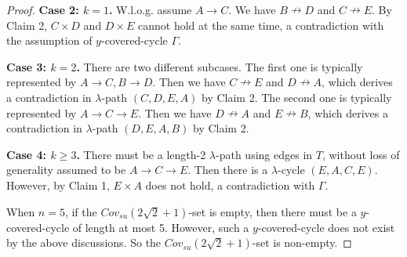 \documentclass[11pt]{article}
\theoremstyle{remark}
\begin{document}
\begin{proof}
\noindent\textbf{Case 2: $k=1$.} W.l.o.g. assume $A\rightarrow C$. We have $B\nrightarrow D$ and $C\nrightarrow E$. By Claim 2, $C\times D$ and $D\times E$ cannot hold at the same time, a contradiction with the assumption of  $y$-covered-cycle $\Gamma$.

\noindent\textbf{Case 3: $k=2$.} There are two different subcases. The first one is typically represented by $A\rightarrow C, B\rightarrow D$. Then we have $C\nrightarrow E$ and $D\nrightarrow A$, which derives a contradiction in $\lambda$-path $(C,D,E,A)$ by Claim 2. The second one is typically represented by $A\rightarrow C\rightarrow E$. Then we have $D\nrightarrow A$ and $E\nrightarrow B$, which derives a contradiction in $\lambda$-path $(D,E,A,B)$ by Claim 2.

\noindent\textbf{Case 4: $k\ge 3$.} There must be a length-2 $\lambda$-path using edges in $T$, without loss of generality assumed to be  $A\rightarrow C\rightarrow E$. Then there is a $\lambda$-cycle $(E,A,C,E)$. However, by Claim 1, $E\times A$ does not hold, a contradiction with $\Gamma$.





When $n=5$, if the $Cov_{su}(2\sqrt2+1)$-set is empty, then there must be a $y$-covered-cycle of length at most 5. However, such a $y$-covered-cycle does not exist by the above discussions. So the $Cov_{su}(2\sqrt2+1)$-set is non-empty.

\end{proof}
\end{document}
